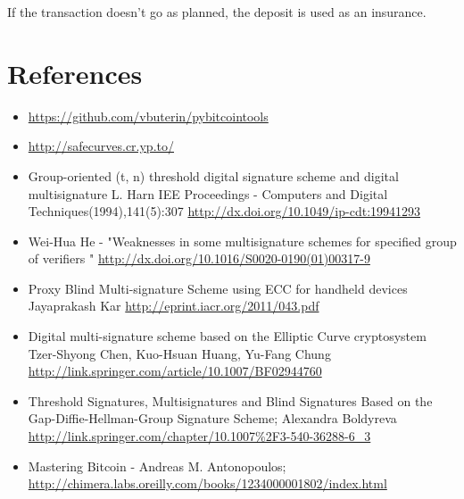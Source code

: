 \documentclass[a4paper]{article}
\begin{document}
If the transaction doesn't go as planned, the deposit is used as an insurance.


\section{References}

\begin{itemize}
\item \url{https://github.com/vbuterin/pybitcointools}
\item \url{http://safecurves.cr.yp.to/}

\item Group-oriented (t, n) threshold digital signature scheme and digital multisignature
L. Harn
IEE Proceedings - Computers and Digital Techniques(1994),141(5):307
\url{http://dx.doi.org/10.1049/ip-cdt:19941293}

\item Wei-Hua He - "Weaknesses in some multisignature schemes for specified group of verifiers "
\url{http://dx.doi.org/10.1016/S0020-0190(01)00317-9}

\item Proxy Blind Multi-signature Scheme using
ECC for handheld devices
Jayaprakash Kar
\url{http://eprint.iacr.org/2011/043.pdf}

\item Digital multi-signature scheme based on the Elliptic Curve cryptosystem
Tzer-Shyong Chen, Kuo-Hsuan Huang, Yu-Fang Chung
\url{http://link.springer.com/article/10.1007/BF02944760}

\item Threshold Signatures, Multisignatures and Blind Signatures Based on the Gap-Diffie-Hellman-Group Signature Scheme; 
Alexandra Boldyreva
\url{http://link.springer.com/chapter/10.1007%2F3-540-36288-6_3}

\item Mastering Bitcoin - Andreas M. Antonopoulos;
\url{http://chimera.labs.oreilly.com/books/1234000001802/index.html}

\end{itemize}
\end{document}
